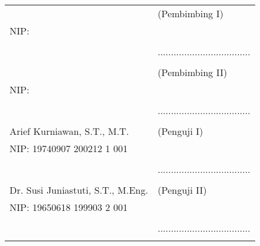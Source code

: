 \noindent
\begin{tabularx}{\textwidth}{X l}
  \advisor{}                        & (Pembimbing I)                      \\
  NIP: \advisornip{}                &                                     \\
                                    &                                     \\
                                    & ................................... \\
                                    &                                     \\
  \coadvisor{}                      & (Pembimbing II)                     \\
  NIP: \coadvisornip{}              &                                     \\
                                    &                                     \\
                                    & ................................... \\
                                    &                                     \\
  Arief Kurniawan, S.T., M.T.       & (Penguji I)                         \\
  NIP: 19740907 200212 1 001        &                                     \\
                                    &                                     \\
                                    & ................................... \\
                                    &                                     \\
  Dr. Susi Juniastuti, S.T., M.Eng. & (Penguji II)                        \\
  NIP: 19650618 199903 2 001        &                                     \\
                                    &                                     \\
                                    & ................................... \\
                                    &                                     \\
\end{tabularx}
\endgroup

